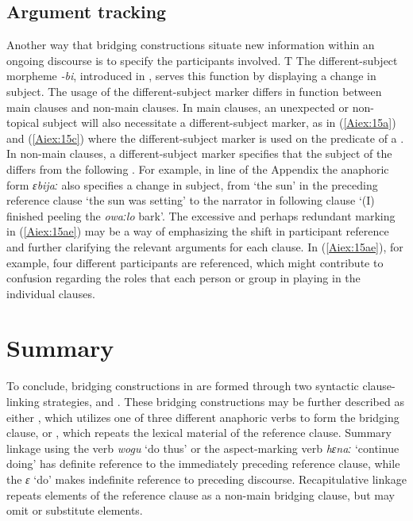 \documentclass[output=paper]{LSP/langsci}
\begin{document}
\subsection{Argument tracking} 
\label{Aitracking}
Another way that bridging constructions situate new information within an ongoing discourse is to specify the participants involved. T
The different-subject morpheme  \textit{-bi}, introduced in , serves this function by displaying a change in subject. The usage of the different-subject marker differs in function between main clauses and non-main clauses. In main clauses, an unexpected or non-topi\-cal subject will also necessitate a different-subject marker, as in (\ref{Aiex:15a}) and (\ref{Aiex:15c}) where the different-subject marker is used on the predicate of a . In non-main clauses, a different-subject marker specifies that the subject of the  differs from the following . For example, in line  of the Appendix the anaphoric form \textit{ɛbijaː} also specifies a change in subject, from `the sun' in the preceding reference clause `the sun was setting' to the narrator in following clause `(I) finished peeling the \textit{owaːlo} bark'. The excessive and perhaps redundant  marking in (\ref{Aiex:15ae}) may be a way of emphasizing the shift in participant reference and further clarifying the relevant arguments for each clause. In (\ref{Aiex:15ae}), for example, four different participants are referenced, which might contribute to confusion regarding the roles that each person or group in playing in the individual clauses.

\section{Summary} 
\label{AiSumm}
To conclude, bridging constructions in  are formed through two syntactic clause-linking strategies,  and . These bridging constructions may be further described as either , which utilizes one of three different anaphoric verbs to form the bridging clause, or , which repeats the lexical material of the reference clause. Summary linkage using the verb \textit{wogu} `do thus' or the aspect-marking verb \textit{hɛnaː} `continue doing' has definite reference to the immediately preceding reference clause, while the  \textit{ɛ} `do' makes indefinite reference to preceding discourse. Recapitulative linkage repeats elements of the reference clause as a non-main bridging clause, but may omit or substitute elements. 
\end{document}
